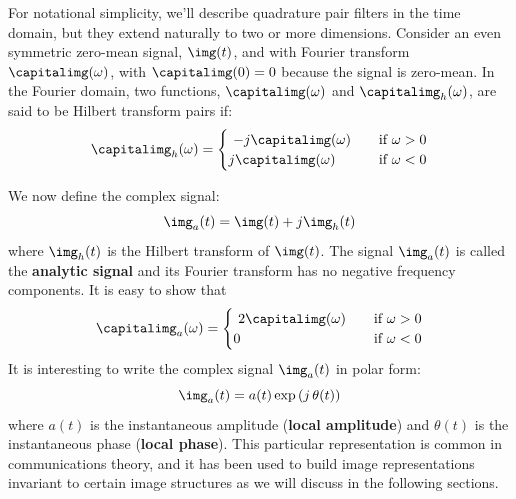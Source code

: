 
For notational simplicity, we'll describe quadrature pair filters in the time domain, but they extend naturally to two or more dimensions. Consider an even symmetric zero-mean signal, $\img (t)$, and with Fourier transform $\capitalimg (\omega)$, with $\capitalimg(0)=0$ because the signal is zero-mean. In the Fourier domain, two functions, $\capitalimg (\omega)$ and $\capitalimg_h(\omega)$, are said to be Hilbert transform pairs if:
\begin{equation}
\capitalimg_h(\omega) = \begin{cases}
    ~  - j \capitalimg(\omega)    & \quad \text{if } \omega >0 \\
    j \capitalimg(\omega)    & \quad \text{if } \omega <0 \\
\end{cases}
\end{equation}

We now define the complex signal:
\begin{equation}
 \img_a(t) = \img(t) + j \img_h(t)
\label{eq:analyticsignal}
\end{equation}
where $\img_h(t)$ is the Hilbert transform of $\img(t)$.
The signal $\img_a(t)$ is called the {\bf analytic signal}
and its Fourier transform has no negative frequency components. It is easy to show that
\begin{equation}
\capitalimg_a(\omega) = \begin{cases}
    ~  2\capitalimg(\omega)    & \quad \text{if } \omega >0 \\
    0    & \quad \text{if } \omega <0 \\
\end{cases}
\end{equation}
It is interesting to write the complex signal $\img_a(t)$ in polar form:
\begin{equation}
\img_a(t) = a(t) \exp \left( j \, \theta (t) \right)
\label{eq:analyticsignalpolar}
\end{equation}
where $a(t)$ is the instantaneous amplitude ({\bf local amplitude})
and $\theta (t)$ is the instantaneous phase ({\bf local phase}).
This particular representation is common in communications theory, and it has been used to build image representations invariant to certain image structures as we will discuss in the following sections. 


